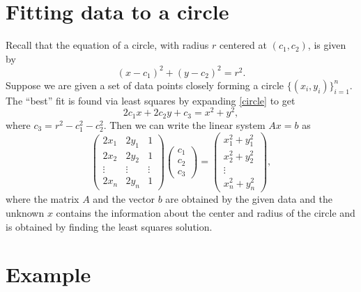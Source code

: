 \label{LeastSquaresCircle}


\section*{Fitting data to a circle}

Recall that the equation of a circle, with radius $r$ centered at $(c_1,c_2)$, is given by
\begin{equation}
\label{circle}
(x-c_1)^2 + (y-c_2)^2 = r^2.
\end{equation}
Suppose we are given a set of data points closely forming a circle $\{(x_i,y_i)\}^n_{i=1}$.  The ``best'' fit is found via least squares by expanding \eqref{circle} to get
\[
2 c_1 x + 2 c_2 y + c_3 = x^2 + y^2,
\]
where $c_3 = r^2 - c_1^2 - c_2^2$.  Then we can write the linear system $A x = b$ as
\[
\begin{pmatrix}
2 x_1 & 2 y_1 & 1\\
2 x_2 & 2 y_2 & 1\\
\vdots & \vdots & \vdots \\
2 x_n & 2 y_n & 1
\end{pmatrix}
\begin{pmatrix}
c_1\\
c_2\\
c_3
\end{pmatrix}=
\begin{pmatrix}
x_1^2 + y_1^2\\
x_2^2 + y_2^2\\
\vdots\\
x_n^2 + y_n^2
\end{pmatrix},
\]
where the matrix $A$ and the vector $b$ are obtained by the given data and the unknown $x$ contains the information about the center and radius of the circle and is obtained by finding the least squares solution.

\section*{Example}

